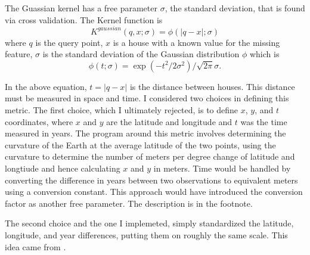 The Guassian kernel has a free parameter $\sigma$, the standard
deviation, that is found via cross validation. The Kernel function is
\[ K^{gaussian}(q, x; \sigma) = \phi (|q - x|; \sigma) \]
where $q$ is the query point, $x$ is a house with a known value for
the missing feature, $\sigma$ is the standard deviation of the
Gaussian distribution $\phi$ which is
\[ \phi(t; \sigma) = \exp(-t^2 / 2 \sigma^2) / \sqrt{2 \pi} \sigma .\]

In the above equation, $t = |q -x|$ is the distance between houses. This
distance must be measured in space and time. I considered two choices in
defining this metric. The first choice, which I ultimately rejected, is to
define $x$, $y$, and $t$ coordinates, where $x$ and $y$ are the latitude and
longitude and $t$ was the time measured in years. The program around this
metric involves determining the curvature of the Earth at the average latitude
of the two points, using the curvature to determine the number of meters per
degree change of latitude and longtiude and hence calculating $x$ and $y$ in
meters. Time would be handled by converting the difference in years between two
observations to equivalent meters using a conversion constant. This approach
would have introduced the conversion factor as another free parameter. The
description is in the footnote\footnotemark.

The second choice and the one I implemeted, simply standardized the
latitude, longitude, and year differences, putting them on roughly the
same scale. This idea came from \cite[p. 174]{hastie-09}.


